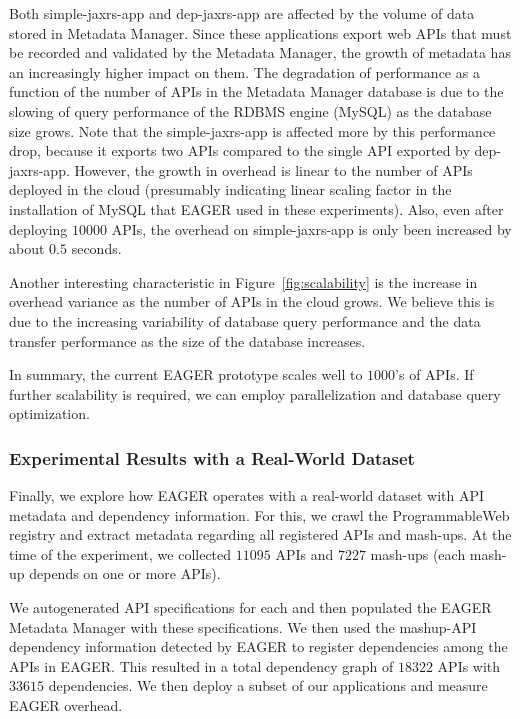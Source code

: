 Both simple-jaxrs-app and dep-jaxrs-app are
affected by the volume of data stored in Metadata Manager. Since these applications 
export web APIs that must be recorded and validated by the Metadata Manager, 
the growth of metadata has an increasingly higher impact on them. 
The degradation 
of performance as a function of the number of APIs in the Metadata Manager
database is due to the slowing of query performance of the RDBMS engine (MySQL) 
as the database size grows. Note that the simple-jaxrs-app
is affected more by this performance drop, because it exports two APIs compared to the single API exported 
by dep-jaxrs-app. However, the growth
in overhead is linear to the number of APIs deployed in the cloud (presumably
indicating linear scaling factor in the installation of MySQL that EAGER used
in these experiments). Also,
even after deploying $10000$ APIs, the overhead on simple-jaxrs-app is only been increased by 
about $0.5$ seconds.

Another interesting characteristic in Figure~\ref{fig:scalability} is the
increase in overhead variance as the number of APIs in the cloud
grows.  We believe this is due to the increasing variability of database query
performance and the data transfer performance as the size of the database
increases.

In summary, the current EAGER prototype scales well to $1000$'s of APIs.
If further scalability is required, we can employ
parallelization and database query optimization.

\subsubsection{Experimental Results with a Real-World Dataset}

Finally, we explore how EAGER operates with a real-world dataset with API
metadata and dependency information. For this, we crawl the ProgrammableWeb
registry and extract metadata regarding all registered APIs and mash-ups.
At the time of the experiment, we collected $11095$ APIs and $7227$ 
mash-ups (each mash-up depends on one or more APIs).

We autogenerated API specifications for each and then
populated the EAGER Metadata Manager with these specifications.
We then used the
mashup-API dependency information detected by EAGER
to register dependencies among the APIs in 
EAGER. This resulted in a total dependency graph of $18322$ APIs 
with $33615$ dependencies.  We then deploy a subset of our applications
and measure EAGER overhead.


